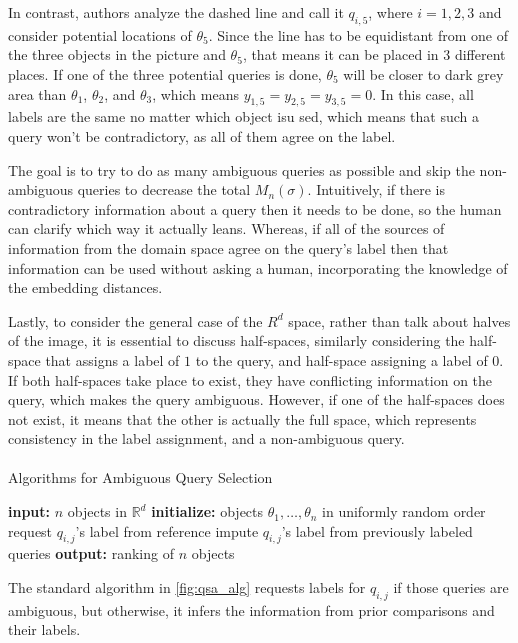 \documentclass[
  letterpaper,
  DIV=11,
  numbers=noendperiod,
  oneside]{scrreprt}
\makeatletter
\let\oldparagraph\paragraph
\renewcommand{\paragraph}{
    \@ifstar
      \xxxParagraphStar
      \xxxParagraphNoStar
  }
\newcommand{\xxxParagraphStar}[1]{\oldparagraph*{#1}\mbox{}}
\newcommand{\xxxParagraphNoStar}[1]{\oldparagraph{#1}\mbox{}}
\theoremstyle{remark}
\makeatother
\begin{document}
In contrast, authors analyze the dashed line and call it \(q_{i,5}\),
where \(i={1,2,3}\) and consider potential locations of \(\theta_5\).
Since the line has to be equidistant from one of the three objects in
the picture and \(\theta_5\), that means it can be placed in 3 different
places. If one of the three potential queries is done, \(\theta_5\) will
be closer to dark grey area than \(\theta_1\), \(\theta_2\), and
\(\theta_3\), which means \(y_{1,5} = y_{2,5} = y_{3,5} = 0\). In this
case, all labels are the same no matter which object isu sed, which
means that such a query won't be contradictory, as all of them agree on
the label.

The goal is to try to do as many ambiguous queries as possible and skip
the non-ambiguous queries to decrease the total \(M_n(\sigma)\).
Intuitively, if there is contradictory information about a query then it
needs to be done, so the human can clarify which way it actually leans.
Whereas, if all of the sources of information from the domain space
agree on the query's label then that information can be used without
asking a human, incorporating the knowledge of the embedding distances.

Lastly, to consider the general case of the \(R^d\) space, rather than
talk about halves of the image, it is essential to discuss half-spaces,
similarly considering the half-space that assigns a label of \(1\) to
the query, and half-space assigning a label of \(0\). If both
half-spaces take place to exist, they have conflicting information on
the query, which makes the query ambiguous. However, if one of the
half-spaces does not exist, it means that the other is actually the full
space, which represents consistency in the label assignment, and a
non-ambiguous query.

\paragraph{Algorithms for Ambiguous Query
Selection}\label{algorithms-for-ambiguous-query-selection}

\textbf{input:} \(n\) objects in \(\mathbb{R}^d\) \textbf{initialize:}
objects \(\theta_1, \dots, \theta_n\) in uniformly random order request
\(q_{i,j}\)'s label from reference impute \(q_{i,j}\)'s label from
previously labeled queries \textbf{output:} ranking of \(n\) objects

The standard algorithm in \hyperref[fig:qsa_alg]{{[}fig:qsa\_alg{]}}
requests labels for \(q_{i,j}\) if those queries are ambiguous, but
otherwise, it infers the information from prior comparisons and their
labels.
\end{document}
